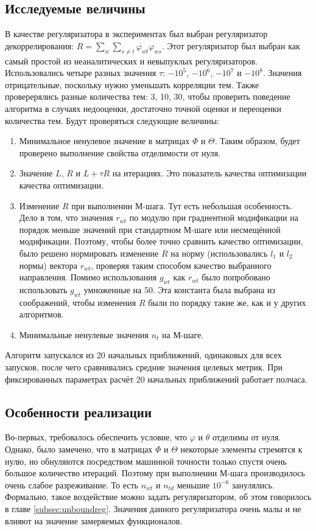 \documentclass[12pt]{article}
\renewcommand{\phi}{\varphi}
\begin{document}
\subsection{Исследуемые величины}
В качестве регуляризатора в экспериментах был выбран регуляризатор декоррелирования: $R = \sum_w \sum_{s \neq t} \phi_{wt} \phi_{ws}$. Этот регуляризатор был выбран как самый простой из неаналитических и невыпуклых регуляризаторов. Использовались четыре разных значения $\tau$: $-10^5$, $-10^6$, $-10^7$ и $-10^8$. Значения отрицательные, поскольку нужно уменьшать корреляции тем. Также проверерялись разные количества тем: 3, 10, 30, чтобы проверить поведение алгоритма в случаях недооценки, достаточно точной оценки и переоценки  количества тем. Будут проверяться следующие величины:
\begin{enumerate}
\item Минимальное ненулевое значение в матрицах $\Phi$ и $\Theta$. Таким образом, будет проверено выполнение свойства отделимости от нуля.
\item Значение $L$, $R$ и $L + \tau R$ на итерациях. Это показатель качества оптимизации качества оптимизации.
\item Изменение $R$ при выполнении М-шага. Тут есть  небольшая особенность. Дело в том, что значения $r_{wt}$ по модулю  при градиентной модификации на порядок меньше значений при стандартном М-шаге или несмещённой модификации. Поэтому, чтобы более точно сравнить качество оптимизации,  было решено нормировать изменение $R$ на норму (использовались $l_1$ и $l_2$ нормы) вектора $r_{wt}$, проверяя таким способом качество выбранного направления. Помимо использования $g_{wt}$ как $r_{wt}$ было попробовано использовать $g_{wt}$ умноженные на 50. Эта константа была выбрана из соображений, чтобы изменения $R$ были по порядку такие же, как и у других алгоритмов.
\item Минимальные ненулевые значения $n_t$  на М-шаге.
\end{enumerate}

Алгоритм  запускался из 20 начальных приближений, одинаковых для всех запусков, после чего сравнивались средние значения целевых метрик. При фиксированных параметрах расчёт 20 начальных приближений работает полчаса.

\subsection{Особенности реализации}
\label{technical}
Во-первых, требовалось обеспечить условие, что $\phi$ и $\theta$ отделимы от нуля. Однако, было замечено, что в матрицах $\Phi$ и $\Theta$ некоторые элементы стремятся к нулю, но обнуляются посредством машинной точности только спустя очень большое количество итераций. Поэтому при выполнении М-шага производилось очень слабое разреживание. То есть  $n_{wt}$ и $n_{td}$ меньшие $10^{-6}$ занулялись. Формально, такое воздействие можно задать регуляризатором, об этом говорилось в главе \ref{subsec:unboundreg}. Значения данного регуляризатора очень малы и не влияют на значение замеряемых функционалов.
\end{document}
